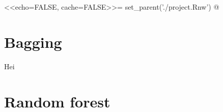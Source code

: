 <<echo=FALSE, cache=FALSE>>=
set_parent('./project.Rnw')
@

\section{Bagging}
\label{sec:Bagging}
Hei

\section{Random forest}
\label{sec:Random forest}
